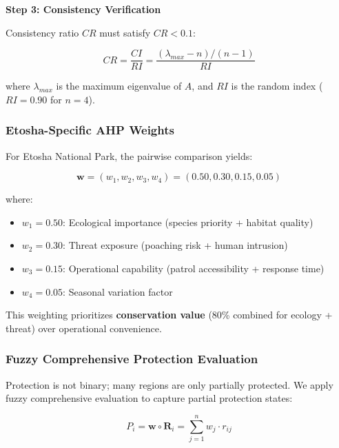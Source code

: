 \textbf{Step 3: Consistency Verification}

Consistency ratio $CR$ must satisfy $CR < 0.1$:

\begin{equation}
CR = \frac{CI}{RI} = \frac{(\lambda_{max} - n)/(n - 1)}{RI}
\label{eq:consistency}
\end{equation}

where $\lambda_{max}$ is the maximum eigenvalue of $A$, and $RI$ is the random index ($RI = 0.90$ for $n=4$).

\subsubsection{Etosha-Specific AHP Weights}

For Etosha National Park, the pairwise comparison yields:

\begin{equation}
\mathbf{w} = (w_1, w_2, w_3, w_4) = (0.50, 0.30, 0.15, 0.05)
\label{eq:etosha_weights}
\end{equation}

\noindent where:
\begin{itemize}
\item $w_1 = 0.50$: Ecological importance (species priority + habitat quality)
\item $w_2 = 0.30$: Threat exposure (poaching risk + human intrusion)
\item $w_3 = 0.15$: Operational capability (patrol accessibility + response time)
\item $w_4 = 0.05$: Seasonal variation factor
\end{itemize}

This weighting prioritizes \textbf{conservation value} (80\% combined for ecology + threat) over operational convenience.

\subsubsection{Fuzzy Comprehensive Protection Evaluation}

Protection is not binary; many regions are only partially protected. We apply fuzzy comprehensive evaluation to capture partial protection states:

\begin{equation}
P_i = \mathbf{w} \circ \mathbf{R}_i = \sum_{j=1}^{n} w_j \cdot r_{ij}
\label{eq:fuzzy_protection}
\end{equation}

